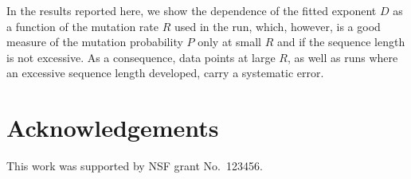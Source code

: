\documentclass[letterpaper]{article}
\begin{document}
In the results reported here, we show the dependence of the fitted
exponent $D$ as a function of the mutation rate $R$ used in the run,
which, however, is a good measure of the mutation probability $P$ only
at small $R$ and if the sequence length is not excessive. As a
consequence, data points at large $R$, as well as runs where an
excessive sequence length developed, carry a systematic error.



\section{Acknowledgements}
This work was supported by NSF grant No.\ 123456.



\footnotesize

\end{document}

